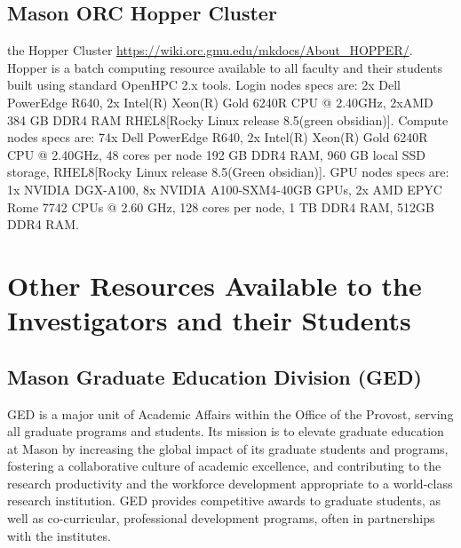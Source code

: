 \documentclass[11pt]{article}
\newcommand{\alert}[1]{{\color{blue}{#1}}}
\begin{document}
\subsection*{Mason ORC Hopper Cluster} \alert{The PIs and their students have access to} the Hopper Cluster \url{https://wiki.orc.gmu.edu/mkdocs/About_HOPPER/}. Hopper is a batch computing resource available to all faculty and their students built using standard OpenHPC 2.x tools. Login nodes specs are: 2x Dell PowerEdge R640, 2x Intel(R) Xeon(R) Gold 6240R CPU @ 2.40GHz, 2xAMD 384 GB DDR4 RAM RHEL8[Rocky Linux release 8.5(green obsidian)]. Compute nodes specs are: 74x Dell PowerEdge R640,
2x Intel(R) Xeon(R) Gold 6240R CPU @ 2.40GHz, 48 cores per node
192 GB DDR4 RAM, 960 GB local SSD storage, RHEL8[Rocky Linux release 8.5(Green obsidian)]. GPU nodes specs are: 1x NVIDIA DGX-A100, 8x NVIDIA A100-SXM4-40GB GPUs, 2x AMD EPYC Rome 7742 CPUs @ 2.60 GHz, 128 cores per node, 1 TB DDR4 RAM, 512GB DDR4 RAM.

\section*{Other Resources Available to the Investigators and their Students}

\subsection*{Mason Graduate Education Division (GED)} GED is a major unit of Academic Affairs within the Office of the Provost, serving all graduate programs and students. Its mission is to elevate graduate education at Mason by increasing the global impact of its graduate students and programs, fostering a collaborative culture of academic excellence, and contributing to the research productivity and the workforce development appropriate to a world-class research institution. GED provides competitive awards to graduate students, as well as co-curricular, professional development programs, often in partnerships with the institutes.

\alert{The PIs will make use of these resources for the graduate students participating in this project. These resources also include professional development programs and opportunities to enrich the graduate student experience and better position the students for furthering their careers post graduation.}
\end{document}
